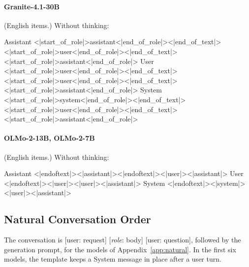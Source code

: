 \paragraph{Granite-4.1-30B} (English items.)
\noindent Without thinking:
\begin{Rendering}
Assistant  <|start_of_role|>assistant<|end_of_role|><|end_of_text|>\NL{}<|start_of_role|>user<|end_of_role|><|end_of_text|>\NL{}<|start_of_role|>assistant<|end_of_role|>
User       <|start_of_role|>user<|end_of_role|><|end_of_text|>\NL{}<|start_of_role|>user<|end_of_role|><|end_of_text|>\NL{}<|start_of_role|>assistant<|end_of_role|>
System     <|start_of_role|>system<|end_of_role|><|end_of_text|>\NL{}<|start_of_role|>user<|end_of_role|><|end_of_text|>\NL{}<|start_of_role|>assistant<|end_of_role|>
\end{Rendering}
\paragraph{OLMo-2-13B, OLMo-2-7B} (English items.)
\noindent Without thinking:
\begin{Rendering}
Assistant  <|endoftext|><|assistant|>\NL{}<|endoftext|>\NL{}<|user|>\NL{}\NL{}<|assistant|>\NL{}
User       <|endoftext|><|user|>\NL{}\NL{}<|user|>\NL{}\NL{}<|assistant|>\NL{}
System     <|endoftext|><|system|>\NL{}\NL{}<|user|>\NL{}\NL{}<|assistant|>\NL{}
\end{Rendering}

\subsection{Natural Conversation Order}
\label{app:templates_natural}

The conversation is [user: request] [\textit{role}: body] [user: question], followed by the generation prompt, for the models of Appendix~\ref{app:natural}. In the first six models, the template keeps a System message in place after a user turn.


